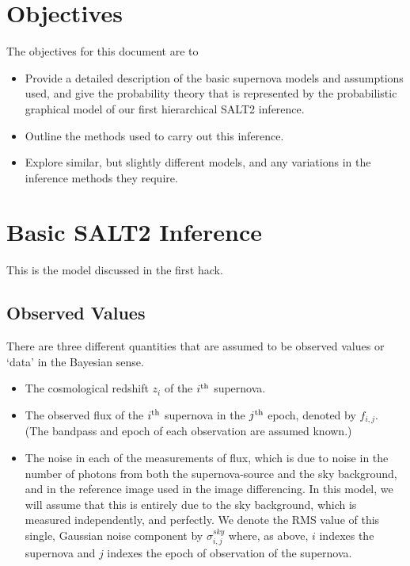 \documentclass{article}[10pt]
\begin{document}
\section{Objectives}
The objectives for this document are to
\begin{itemize}
\item Provide a detailed description of the basic supernova models and assumptions used, and give the probability theory that is represented by the probabilistic graphical model of our first hierarchical SALT2 inference.
\item Outline the methods used to carry out this inference.
\item Explore similar, but slightly different models, and any variations in the inference methods they require.
\end{itemize}

\section{Basic SALT2 Inference}
This is the model discussed in the first hack.

\subsection{Observed Values}

There are three different quantities that are assumed to be observed values or
`data' in the Bayesian sense.
\begin{itemize}
\item The cosmological redshift $z_i$ of the $i^{\rm th}$ supernova.
\item The observed flux of the $i^{\rm th}$ supernova in the $j^{\rm th}$ epoch, denoted by $f_{i,j}$. (The bandpass and epoch of each observation are assumed known.)
\item The noise in each of the measurements of flux, which is due to noise in the number of photons from both the supernova-source and the sky background, and in the reference image used in the image differencing. In this model, we will assume that this is entirely due to the sky background, which is measured independently, and perfectly. We denote the RMS value of this single, Gaussian noise component by
$\sigma^{sky}_{i,j}$ where, as above, $i$ indexes the supernova and $j$ indexes the epoch of observation of the supernova.
\end{itemize}
\end{document}

